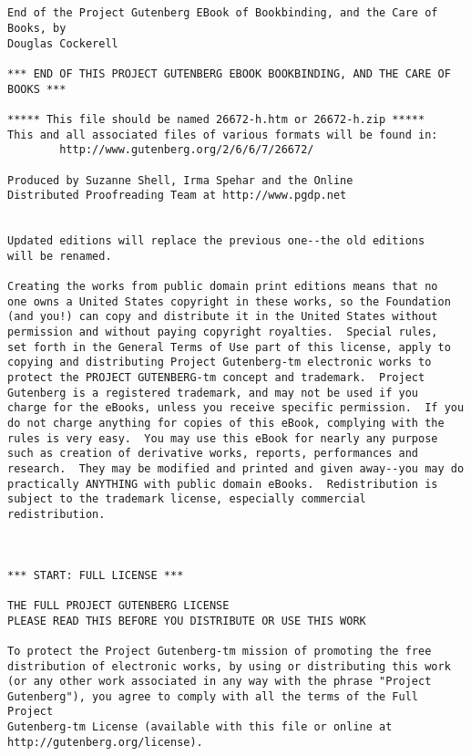 \documentclass[
]{article}
\begin{document}
\begin{verbatim}





End of the Project Gutenberg EBook of Bookbinding, and the Care of Books, by 
Douglas Cockerell

*** END OF THIS PROJECT GUTENBERG EBOOK BOOKBINDING, AND THE CARE OF BOOKS ***

***** This file should be named 26672-h.htm or 26672-h.zip *****
This and all associated files of various formats will be found in:
        http://www.gutenberg.org/2/6/6/7/26672/

Produced by Suzanne Shell, Irma Spehar and the Online
Distributed Proofreading Team at http://www.pgdp.net


Updated editions will replace the previous one--the old editions
will be renamed.

Creating the works from public domain print editions means that no
one owns a United States copyright in these works, so the Foundation
(and you!) can copy and distribute it in the United States without
permission and without paying copyright royalties.  Special rules,
set forth in the General Terms of Use part of this license, apply to
copying and distributing Project Gutenberg-tm electronic works to
protect the PROJECT GUTENBERG-tm concept and trademark.  Project
Gutenberg is a registered trademark, and may not be used if you
charge for the eBooks, unless you receive specific permission.  If you
do not charge anything for copies of this eBook, complying with the
rules is very easy.  You may use this eBook for nearly any purpose
such as creation of derivative works, reports, performances and
research.  They may be modified and printed and given away--you may do
practically ANYTHING with public domain eBooks.  Redistribution is
subject to the trademark license, especially commercial
redistribution.



*** START: FULL LICENSE ***

THE FULL PROJECT GUTENBERG LICENSE
PLEASE READ THIS BEFORE YOU DISTRIBUTE OR USE THIS WORK

To protect the Project Gutenberg-tm mission of promoting the free
distribution of electronic works, by using or distributing this work
(or any other work associated in any way with the phrase "Project
Gutenberg"), you agree to comply with all the terms of the Full Project
Gutenberg-tm License (available with this file or online at
http://gutenberg.org/license).



\end{verbatim}
\end{document}
